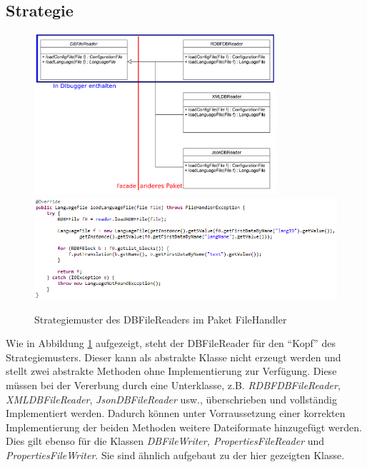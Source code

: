 \documentclass[parskip=full]{scrartcl}
\begin{document}
\subsection{Strategie}
\begin{figure}[!h]
\centering
\includegraphics[width=0.8\textwidth]{document_data/Strategy_uml_d.pdf}
\includegraphics[width=1.0\textwidth]{document_data/loadLangFile.png}
\caption{Strategiemuster des DBFileReaders im Paket FileHandler}
\label{fig:strategy_fh}
\end{figure}
Wie in Abbildung \ref{fig:strategy_fh} aufgezeigt, steht der DBFileReader für den \enquote{Kopf} des Strategiemusters.
Dieser kann als abstrakte Klasse nicht erzeugt werden und stellt zwei abstrakte Methoden ohne Implementierung zur Verfügung.
Diese müssen bei der Vererbung durch eine Unterklasse, z.B. \textit{RDBFDBFileReader}, \textit{XMLDBFileReader}, \textit{JsonDBFileReader} usw., überschrieben und vollständig Implementiert werden.
Dadurch können unter Vorraussetzung einer korrekten Implementierung der beiden Methoden weitere Dateiformate hinzugefügt werden.
Dies gilt ebenso für die Klassen \textit{DBFileWriter, PropertiesFileReader} und \textit{PropertiesFileWriter}. Sie sind ähnlich aufgebaut zu der hier gezeigten Klasse.
\end{document}
